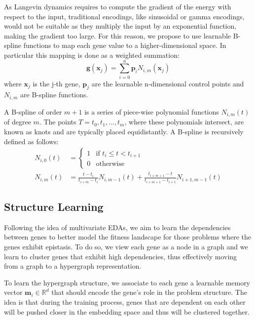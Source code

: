 As Langevin dynamics requires to compute the gradient of the energy with respect to the input, traditional encodings, like sinusoidal or gamma encodings, would not be suitable as they multiply the input by an exponential function, making the gradient too large. For this reason, we propose to use learnable B-spline functions to map each gene value to a higher-dimensional space. In particular this mapping is done as a weighted summation:
\begin{equation*}
    \mathbf{g}(\mathbf{x}_j) = \sum_{i=0}^n \mathbf{p}_i N_{i,m}(\mathbf{x}_j)
\end{equation*}
where $\mathbf{x}_j$ is the j-th gene, $\mathbf{p}_j$ are the learnable n-dimensional control points and $N_{i,m}$ are B-spline functions.

A B-spline of order $m+1$ is a series of piece-wise polynomial functions $N_{i,m}(t)$ of degree $m$. The points $T=t_0, t_1, \dots, t_m$, where these polynomials intersect, are known as knots and are typically placed equidistantly. A B-spline is recursively defined as follows:
\begin{align*}
    N_{i,0}(t) & = \begin{cases}
                       1 & \text{if } t_i \leq t < t_{i+1} \\
                       0 & \text{otherwise}
                   \end{cases}                                                                   \\
    N_{i,m}(t) & = \frac{t - t_i}{t_{i+m} - t_i} N_{i,m-1}(t) + \frac{t_{i+m+1} - t}{t_{i+m+1} - t_{i+1}} N_{i+1,m-1}(t)
\end{align*}
\subsection*{Structure Learning}

Following the idea of multivariate EDAs, we aim to learn the dependencies between genes to better model the fitness landscape for those problems where the genes exhibit epistasis. To do so, we view each gene as a node in a graph and we learn to cluster genes that exhibit high dependencies, thus effectively moving from a graph to a hypergraph representation.

To learn the hypergraph structure, we associate to each gene a learnable memory vector $\mathbf{m}_i \in \mathbb{R}^d$ that should encode the gene's role in the problem structure. The idea is that during the training process, genes that are dependent on each other will be pushed closer in the embedding space and thus will be clustered together.

